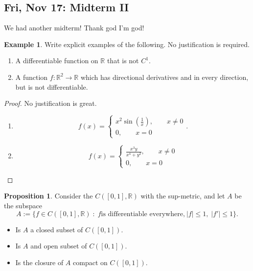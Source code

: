 \documentclass[10pt, oneside]{article}
\newcommand{\bbR}{\mathbb{R}}
\theoremstyle{definition}
\newtheorem{exmp}{Example}[section]
\newtheorem{prop}{Proposition}
\begin{document}
\subsection{Fri, Nov 17: Midterm II}
We had another midterm! Thank god I'm god! 
\begin{exmp}
Write explicit examples of the following. No justification is required.
\begin{enumerate}
    \item A differentiable function on $\bbR$ that is not $C^1.$
    \item A function $f: \bbR^2 \to \bbR$ which has directional derivatives and in every direction, but is not differentiable.
\end{enumerate}    
\end{exmp}
\begin{proof}
    No justification is great.
    \begin{enumerate}
        \item \[f(x) = \begin{cases}
            x^2\sin(\frac{1}{x}), \qquad x\neq 0\\
            0, \qquad x = 0
        \end{cases}.\]
        \item \[f(x) = \begin{cases}
            \frac{x^3y}{x^4 + y^2}, \qquad x \neq 0\\
            0, \qquad x = 0
        \end{cases} \]
    \end{enumerate}
\end{proof}
\begin{prop}
    Consider the $C([0,1], \bbR)$ with the sup-metric, and let $A$ be the subspace
    \[A:= \{f \in C([0,1], \bbR)\; : \; f \text{is differentiable everywhere,} \: |f|\leq 1, \; |f'|\leq 1\}.\]
    \begin{itemize}
        \item Is $A$ a closed subset of $C([0,1]).$
        \item Is $A$ and open subset of $C([0,1]).$
        \item Is the closure of $A$ compact on $C([0,1]).$
    \end{itemize}
\end{prop}
\end{document}
